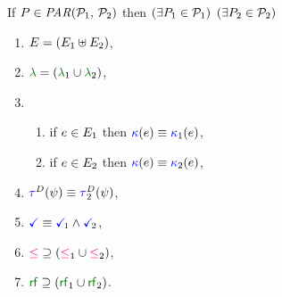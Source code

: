 \noindent
\begin{minipage}{1.0\linewidth}
  If $\aPS \in \sPAR{\aPSS_1}{\aPSS_2}$ then  
  $(\exists P_1\in\mathcal{P}_1)$ $(\exists P_2\in\mathcal{P}_2)$
  \begin{multicols}{2}
    \begin{enumerate}[topsep=0pt,label=(\textsc{p}\arabic*),ref=\textsc{p}\arabic*]
    \item \label{par-E}
      $E = (E_1\uplus E_2)$,
    \item \label{par-lambda}
      ${\labeling}=\PBR{{\labeling_1}\cup {\labeling_2}}$, 
    \item[] 
      \begin{enumerate}[leftmargin=0pt]
      \item \label{par-kappa1}
        if $e\in E_1$ then ${\color{blue}\kappa}(e) \mathrel{\equiv} {\color{blue}\kappa}_1(e)$,
      \item \label{par-kappa2}
        if $e\in E_2$ then ${\color{blue}\kappa}(e) \mathrel{\equiv} {\color{blue}\kappa}_2(e)$,
      \end{enumerate}
    \item \label{par-tau}
      $\aTr{\bEvs}{\bForm} \riff \aTr[2]{\bEvs}{\bForm}$,
    \item \label{par-term}
      $\aTerm \riff \aTerm[1]\land\aTerm[2]$,
    \item \label{par-le}
        ${\le}\rsupset{\le_1}{\le_2}$,
    \item \label{par-rf}
        ${\rrfx}\rsupset{\rrfx_1}{\rrfx_2}$.
    \end{enumerate}
  \end{multicols}
\end{minipage}
\smallskip

